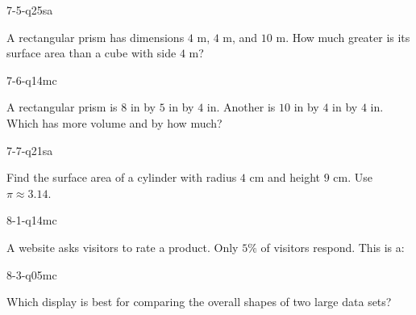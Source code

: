 \begin{practiceQuestion}{7-5-q25}{sa}
\begin{questionText}
A rectangular prism has dimensions $4$ m, $4$ m, and $10$ m. How much greater is its surface area than a cube with side $4$ m?
\end{questionText}
\end{practiceQuestion}

\begin{practiceQuestion}{7-6-q14}{mc}
\begin{questionText}
A rectangular prism is $8$ in by $5$ in by $4$ in. Another is $10$ in by $4$ in by $4$ in. Which has more volume and by how much?
\end{questionText}
\end{practiceQuestion}

\begin{practiceQuestion}{7-7-q21}{sa}
\begin{questionText}
Find the surface area of a cylinder with radius $4$ cm and height $9$ cm. Use $\pi \approx 3.14$.
\end{questionText}
\end{practiceQuestion}

\begin{practiceQuestion}{8-1-q14}{mc}
\begin{questionText}
A website asks visitors to rate a product. Only $5\%$ of visitors respond. This is a:
\end{questionText}
\end{practiceQuestion}

\begin{practiceQuestion}{8-3-q05}{mc}
\begin{questionText}
Which display is best for comparing the overall shapes of two large data sets?
\end{questionText}
\end{practiceQuestion}

